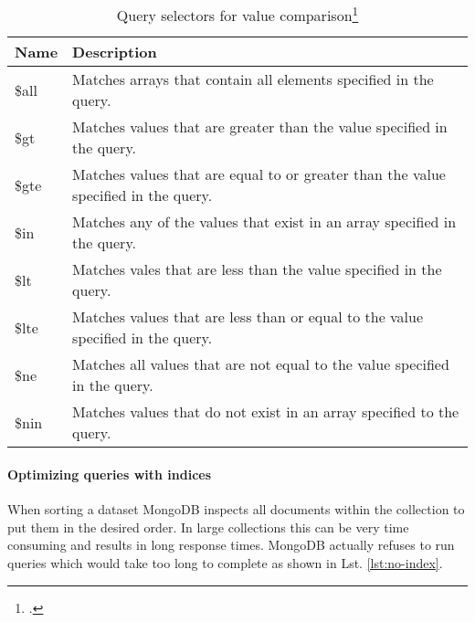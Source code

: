 \begin{listing}
    \caption[Exemplary usage of query operators]{Exemplary usage of query operators\footcite[][9]{mongo_crud_manual}}
    \label{lst:query-operators}
\end{listing}


\begin{savenotes}
\begin{table}[htbp]
\begin{tabular*}{\textwidth}{p{} p{}}
\toprule
\textbf{Name} 					& \textbf{Description}\\
\midrule 
\$all    & Matches arrays that contain all elements specified in the query. \\
\$gt     & Matches values that are greater than the value specified in the query.\\
\$gte    & Matches values that are equal to or greater than the value specified in the query.\\
\$in     & Matches any of the values that exist in an array specified in the query.\\
\$lt     & Matches vales that are less than the value specified in the query.\\
\$lte    & Matches values that are less than or equal to the value specified in the query.\\
\$ne     & Matches all values that are not equal to the value specified in the query.\\
\$nin    & Matches values that do not exist in an array specified to the query.\\
\bottomrule 
\end{tabular*}
  \caption[Query selectors for value comparison]{Query selectors for value comparison\footcite[][]{mongo_query_ops}}
  \label{tab:query-selectors-compare}
\end{table}
\end{savenotes}


\paragraph{Optimizing queries with indices}
When sorting a dataset MongoDB inspects all documents within the collection
to put them in the desired order. In large collections this can be very time
consuming and results in long response times.
MongoDB actually refuses to run queries which would take too long to complete as shown in
Lst. \ref{lst:no-index}.


